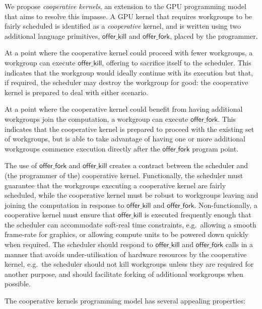 \documentclass[numbers,nocopyrightspace,10pt]{sigplanconf}
\newcommand{\offerfork}{\mathsf{offer\_fork}}
\newcommand{\offerkill}{\mathsf{offer\_kill}}
\begin{document}
We propose \emph{cooperative kernels}, an extension to the GPU
programming model that aims to resolve this impasse.  A GPU kernel
that requires workgroups to be fairly scheduled is identified as a
\emph{cooperative} kernel, and is written using two additional
language primitives, $\offerkill$ and $\offerfork$, placed by the programmer.

At a point where the cooperative kernel could proceed with fewer
workgroups, a workgroup can execute $\offerkill$, offering to
sacrifice itself to the scheduler.  This indicates that the workgroup
would ideally continue with its execution but that, if required, the
scheduler may destroy the workgroup for good: the cooperative kernel
is prepared to deal with either scenario.

At a point where the cooperative kernel could benefit from having
additional workgroups join the computation, a workgroup can execute
$\offerfork$.  This indicates that the cooperative
kernel is prepared to proceed with the existing set of workgroups, but
is able to take advantage of having one or more additional workgroups
commence execution directly after the $\offerfork$ program point.

The use of $\offerfork$ and $\offerkill$ creates a contract between
the scheduler and (the programmer of the) cooperative kernel.
Functionally, the
scheduler must guarantee that the workgroups executing a cooperative
kernel are fairly scheduled, while the cooperative kernel must be
robust to workgroups leaving and joining the computation in response
to $\offerkill$ and $\offerfork$.  Non-functionally, a cooperative
kernel must ensure that $\offerkill$ is executed frequently enough
that the scheduler can accommodate soft-real time constraints,
e.g.\ allowing a smooth frame-rate for graphics, or allowing compute
units to be powered down quickly when required.  The scheduler should
respond to $\offerkill$ and $\offerfork$ calls in a manner that avoids
under-utilisation of hardware resources by the cooperative kernel,
e.g.\ the scheduler should not kill workgroups unless they are
required for another purpose, and should facilitate forking of
additional workgroups when possible.

The cooperative kernels programming model has several appealing
properties:
\end{document}
